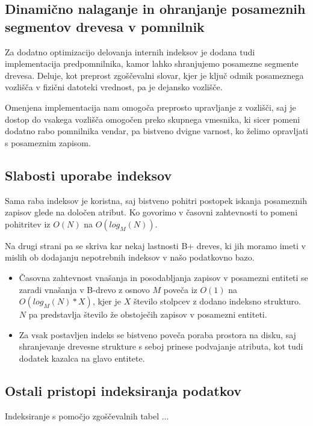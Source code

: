 \documentclass[a4paper,12pt,openright]{book}
\begin{document}
        \subsection{Dinamično nalaganje in ohranjanje posameznih segmentov drevesa v pomnilnik}
        Za dodatno optimizacijo delovanja internih indeksov je dodana tudi implementacija predpomnilnika, kamor lahko shranjujemo posamezne segmente drevesa. Deluje, kot preprost zgoščevalni slovar, kjer je ključ odmik posameznega vozlišča v fizični datoteki vrednost, pa je dejansko vozlišče.

        Omenjena implementacija nam omogoča preprosto upravljanje z vozlišči, saj je dostop do vsakega vozlišča omogočen preko skupnega vmesnika, ki sicer pomeni dodatno rabo pomnilnika vendar, pa bistveno dvigne varnost, ko želimo opravljati s posameznim zapisom.
        
        \subsection{Slabosti uporabe indeksov}

        Sama raba indeksov je koristna, saj bistveno pohitri postopek iskanja posameznih zapisov glede na določen atribut. Ko govorimo v časovni zahtevnosti to pomeni pohitritev iz $O(N)$ na $O(log_M(N))$.

        Na drugi strani pa se skriva kar nekaj lastnosti B+ dreves, ki jih moramo imeti v mislih ob dodajanju nepotrebnih indeksov v našo podatkovno bazo.
        \begin{itemize}
            \item Časovna zahtevnost vnašanja in posodabljanja zapisov v posamezni entiteti se zaradi vnašanja v B-drevo z osnovo $M$ poveča iz $O(1)$ na $O(log_M(N) * X)$, kjer je $X$ število stolpcev z dodano indeksno strukturo. $N$ pa predstavlja število že obstoječih zapisov v posamezni entiteti.
            \item Za vsak postavljen indeks se bistveno poveča poraba prostora na disku, saj shranjevanje drevesne strukture s seboj prinese podvajanje atributa, kot tudi dodatek kazalca na glavo entitete.
        \end{itemize}

        \subsection{Ostali pristopi indeksiranja podatkov}
        \colorbox{BurntOrange}{Indeksiranje s pomočjo zgoščevalnih tabel ...}
\end{document}
